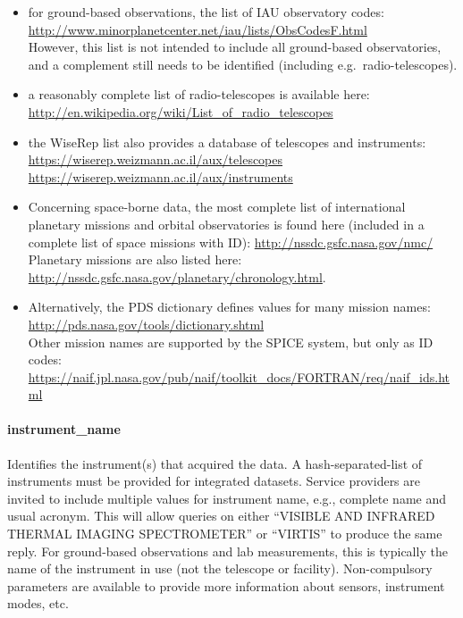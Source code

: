 \documentclass[11pt,a4paper]{ivoa}
\begin{document}
\begin{itemize}
\item for ground-based observations, the list of IAU observatory
codes:\\
\url{http://www.minorplanetcenter.net/iau/lists/ObsCodesF.html}
\\However, this list is not intended to include all ground-based
observatories, and a complement still needs to be identified (including
e.g.\ radio-telescopes).

\item a reasonably complete list of radio-telescopes is available here:\\
\url{http://en.wikipedia.org/wiki/List_of_radio_telescopes}

\item the WiseRep list also
provides a  database of telescopes and instruments:\\
\url{https://wiserep.weizmann.ac.il/aux/telescopes}\\
\url{https://wiserep.weizmann.ac.il/aux/instruments}

\item Concerning space-borne data, the most complete list of
international planetary missions and orbital observatories is
found here (included in a complete list of space missions with ID):
\url{http://nssdc.gsfc.nasa.gov/nmc/}\\
Planetary missions are also listed here:
\url{http://nssdc.gsfc.nasa.gov/planetary/chronology.html}.

\item Alternatively, the PDS dictionary defines values
for many mission names:\\
\url{http://pds.nasa.gov/tools/dictionary.shtml}\\
Other mission names are supported by the SPICE system,
but only as ID codes:\\
\url{https://naif.jpl.nasa.gov/pub/naif/toolkit_docs/FORTRAN/req/naif_ids.html}
\end{itemize}

\paragraph{instrument\_name}

Identifies the instrument(s) that acquired the data.
A hash-separated-list of instruments must be provided
for integrated datasets.
Service providers are invited to include multiple values
for instrument name, e.g., complete name and usual acronym.
This will allow queries on either
``VISIBLE AND INFRARED THERMAL IMAGING SPECTROMETER'' or ``VIRTIS''
to produce the same reply. For ground-based observations and lab
measurements, this is typically the name of the instrument in use (not
the telescope or facility). Non-compulsory parameters are available to
provide more information about sensors, instrument modes, etc.
\end{document}
